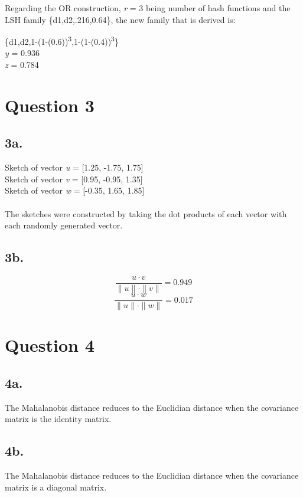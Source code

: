 \documentclass{article}
\begin{document}
\noindent Regarding the OR construction, \emph{r} = 3 being number of hash functions and the LSH family \{d1,d2,.216,0.64\}, the new family that is derived is:

\begin{center}
\{d1,d2,1-(1-(0.6))\textsuperscript3,1-(1-(0.4))\textsuperscript3\}\vspace{2mm}\\
\noindent \emph{y} = 0.936\\
\emph{z} = 0.784
\end{center}


\section{Question 3}

\subsection{3a.}
Sketch of vector \emph{u} = [1.25, -1.75, 1.75]\\
Sketch of vector \emph{v} = [0.95, -0.95, 1.35]\\
Sketch of vector \emph{w} = [-0.35, 1.65, 1.85]\\
\\The sketches were constructed by taking the dot products of each vector with each randomly generated vector.

\subsection{3b.}
\begin{equation}
\frac{u \cdot v}{\|u\| \cdot \|v\|} = 0.949
\end{equation}
\vspace{3mm}
\begin{equation}
\frac{u \cdot w}{\|u\| \cdot \|w\|} = 0.017
\end{equation}

\section{Question 4}

\subsection{4a.}
The Mahalanobis distance reduces to the Euclidian distance when the covariance matrix is the identity matrix.

\subsection{4b.}
The Mahalanobis distance reduces to the Euclidian distance when the covariance matrix is a diagonal matrix.
\end{document}
